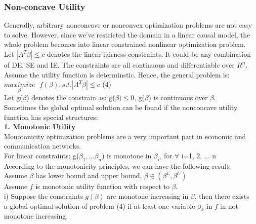 \documentclass{article} %
\begin{document}
\subsubsection{Non-concave Utility}
\hspace*{1em}Generally, arbitrary nonconcave or nonconvex optimization problems are not easy to solve. However, since we've restricted the domain in a linear causal model, the whole problem becomes into linear constrained nonlinear optimization problem.\\
\hspace*{1em}Let $|A^T\beta|\leq c$ denotes the linear fairness constraints. It could be any combination of DE, SE and IE. The constraints are all continuous and differentiable over $R^n$.\\
\hspace*{1em}Assume the utility function is determinstic. Hence, the general problem is:\\
\hspace*{12em}$\underset{\beta}{maximize}\,\,\,\, f(\beta), s.t. |A^T\beta|\leq c$ \hfill(4)\\ 
\hspace*{1em}Let g($\beta$) denotes the constrain as: g($\beta)\leq 0$, g($\beta$) is continuous over $\beta$.\\
\hspace*{1em}Sometimes the global optimal solution can be found if the nonconcave utility function has special structures:\\
\hspace*{1em}\textbf{1. Monotonic Utility}\\
\hspace*{1em}Monotonicity optimization problems are a very important part in economic and communication networks.\\
\hspace*{1em}For linear constraints: g($\beta_1, ... \beta_n$) is monotone in $\beta_i$, for $\forall$ i=1, 2, ... n\\
\hspace*{1em}According to the monotonicity principles, we can have the following result:\\
\hspace*{1em}Assume $\beta$ has lower bound and upper bound, $\beta\in(\beta^L, \beta^U)$\\
\hspace*{1em}Assume $f$ is monotonic utility function with respect to $\beta$.\\
\hspace*{1em}i) Suppose the constraints $g(\beta)$ are monotone increasing in $\beta$, then there exists a global optimal solution of problem (4) if at least one variable $\beta_k$ in $f$ in not monotone increasing.\\
\end{document}
